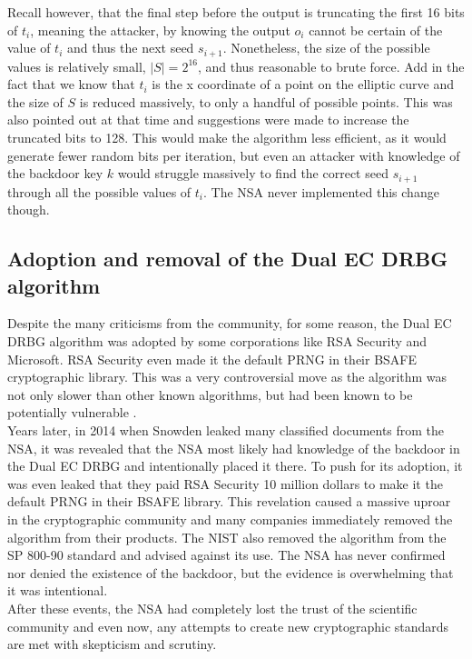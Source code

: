 Recall however, that the final step before the output is truncating the first 16 bits of $t_i$, meaning the attacker, by knowing the output $o_i$ cannot be certain of the value of $t_i$ and thus the next seed $s_{i + 1}$. Nonetheless, the size of the possible values is relatively small, $|S| = 2^{16}$, and thus reasonable to brute force. Add in the fact that we know that $t_i$ is the x coordinate of a point on the elliptic curve and the size of $S$ is reduced massively, to only a handful of possible points. This was also pointed out at that time \cite{backdoor} and suggestions were made to increase the truncated bits to 128. This would make the algorithm less efficient, as it would generate fewer random bits per iteration, but even an attacker with knowledge of the backdoor key $k$ would struggle massively to find the correct seed $s_{i + 1}$ through all the possible values of $t_i$. The NSA never implemented this change though.

\subsection{Adoption and removal of the Dual EC DRBG algorithm}

Despite the many criticisms from the community, for some reason, the Dual EC DRBG algorithm was adopted by some corporations like RSA Security and Microsoft. RSA Security even made it the default PRNG in their BSAFE cryptographic library. This was a very controversial move as the algorithm was not only slower than other known algorithms, but had been known to be potentially vulnerable \cite{dual-ec-drbg-backdoor}.
\\

Years later, in 2014 when Snowden leaked many classified documents from the NSA, it was revealed that the NSA most likely had knowledge of the backdoor in the Dual EC DRBG and intentionally placed it there. To push for its adoption, it was even leaked that they paid RSA Security 10 million dollars to make it the default PRNG in their BSAFE library. This revelation caused a massive uproar in the cryptographic community and many companies immediately removed the algorithm from their products. The NIST also removed the algorithm from the SP 800-90 standard and advised against its use. The NSA has never confirmed nor denied the existence of the backdoor, but the evidence is overwhelming that it was intentional.
\\

After these events, the NSA had completely lost the trust of the scientific community and even now, any attempts to create new cryptographic standards are met with skepticism and scrutiny.